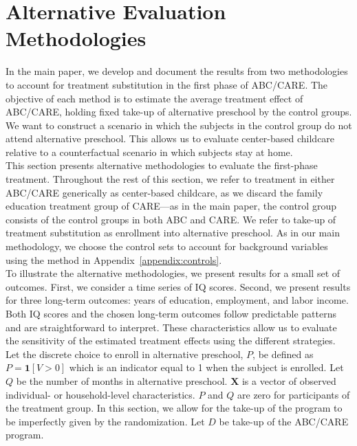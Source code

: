 \section{Alternative Evaluation Methodologies} \label{appendix:amethodology}

\noindent In the main paper, we develop and document the results from two methodologies to account for treatment substitution in the first phase of ABC/CARE. The objective of each method is to estimate the average treatment effect of ABC/CARE, holding fixed take-up of alternative preschool by the control groups. We want to construct a scenario in which the subjects in the control group do not attend alternative preschool. This allows us to evaluate center-based childcare relative to a counterfactual scenario in which subjects stay at home.\\

\noindent This section presents alternative methodologies to evaluate the first-phase treatment. Throughout the rest of this section, we refer to treatment in either ABC/CARE generically as center-based childcare, as we discard the family education treatment group of CARE---as in the main paper, the control group consists of the control groups in both ABC and CARE. We refer to take-up of treatment substitution as enrollment into alternative preschool. As in our main methodology, we choose the control sets to account for background variables using the method in Appendix~\ref{appendix:controls}.\\

\noindent To illustrate the alternative methodologies, we present results for a small set of outcomes. First, we consider a time series of IQ scores. Second, we present results for three long-term outcomes: years of education, employment, and labor income. Both IQ scores and the chosen long-term outcomes follow predictable patterns and are straightforward to interpret. These characteristics allow us to evaluate the sensitivity of the estimated treatment effects using the different strategies.\\

\noindent Let the discrete choice to enroll in alternative preschool, $P$, be defined as $P=\mathbf{1}\left[V>0\right]$ which is an indicator equal to 1 when the subject is enrolled. Let $Q$ be the number of months in alternative preschool. $\mathbf{X}$ is a vector of observed individual- or household-level characteristics. $P$ and $Q$ are zero for participants of the treatment group. In this section, we allow for the take-up of the program to be imperfectly given by the randomization. Let $D$ be take-up of the ABC/CARE program.

